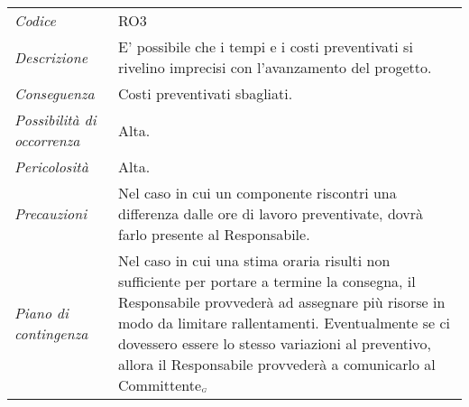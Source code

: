 {{{{{{\def\tabularxcolumn#1{m{#1}}
{
	
	\begin{center}
		\renewcommand{\arraystretch}{1.4}
		\begin{longtable}{|p{5cm}|p{12cm}|}
			\hline
			\rowcolor{airforceblue}
			\multicolumn{2}{|c|}{\textit{Calcolo dei tempi e dei costi}}\\
			\hline
			\textit{Codice} & RO3 \\
			\hline
			\textit{Descrizione} & E' possibile che i tempi e i costi preventivati si rivelino imprecisi con l'avanzamento del progetto. \\
			\hline
			\textit{Conseguenza} & Costi preventivati sbagliati. \\
			\hline
			\textit{Possibilità di occorrenza} & Alta. \\
			\hline
			\textit{Pericolosità} & Alta. \\
			\hline
			\textit{Precauzioni} & Nel caso in cui un componente riscontri una differenza dalle ore di lavoro preventivate, dovrà farlo presente al Responsabile.  \\
			\hline
			\textit{Piano di contingenza} & Nel caso in cui una stima oraria risulti non sufficiente per portare a termine la consegna, il Responsabile provvederà ad assegnare più risorse in modo da limitare rallentamenti. Eventualmente se ci dovessero essere lo stesso variazioni al preventivo, allora il Responsabile provvederà a comunicarlo al Committente$_{\scaleto{G}{3pt}}$ \\
			\hline
		\end{longtable}
	\end{center}

\def\tabularxcolumn#1{m{#1}}
{
	
}}}}}}}}
